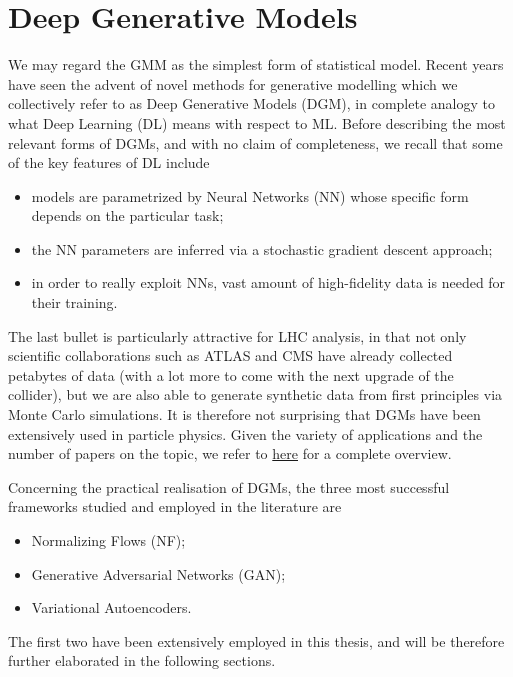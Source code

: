 \section{Deep Generative Models}\label{sec:DGM}
We may regard the GMM as the simplest form of statistical model. Recent years have seen the advent of novel methods for generative modelling which we collectively refer to as Deep Generative Models (DGM), in complete analogy to what Deep Learning (DL) means with respect to ML. 
Before describing the most relevant forms of DGMs, and with no claim of completeness, we recall that some of the key features of DL include
\begin{itemize}
\item
models are parametrized by Neural Networks (NN) whose specific form depends on the particular task;
\item
the NN parameters are inferred via a stochastic gradient descent approach;
\item
in order to really exploit NNs, vast amount of high-fidelity data is needed for their training.
\end{itemize}
The last bullet is particularly attractive for LHC analysis, in that not only scientific collaborations such as ATLAS and CMS have already collected petabytes of data (with a lot more to come with the next upgrade of the collider), but we are also able to generate synthetic data from first principles via Monte Carlo simulations. It is therefore not surprising that DGMs have been extensively used in particle physics. Given the variety of applications and the number of papers on the topic, we refer to \href{https://github.com/iml-wg/HEPML-LivingReview}{here} for a complete overview.

Concerning the practical realisation of DGMs, the three most successful frameworks studied and employed in the literature are
\begin{itemize}
\item
Normalizing Flows (NF);
\item
Generative Adversarial Networks (GAN);
\item
Variational Autoencoders.
\end{itemize}
The first two have been extensively employed in this thesis, and will be therefore further elaborated in the following sections.

